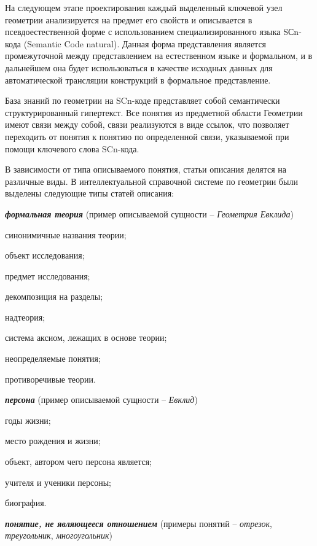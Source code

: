 На следующем этапе проектирования каждый выделенный ключевой узел геометрии анализируется на предмет его свойств и описывается в псевдоестественной форме с использованием специализированного языка SСn-кода (Semantic Code natural). Данная форма представления является промежуточной между представлением на естественном языке и формальном, и в дальнейшем она будет использоваться в качестве исходных данных для автоматической трансляции конструкций в формальное представление.

База знаний по геометрии на SCn-коде представляет собой семантически структурированный гипертекст. Все понятия из предметной области Геометрии имеют связи между собой, связи реализуются в виде ссылок, что позволяет переходить от понятия к понятию по определенной связи, указываемой при помощи ключевого слова SCn-кода.

В зависимости от типа описываемого понятия, статьи описания делятся на различные виды. В интеллектуальной справочной системе по геометрии были выделены следующие типы статей описания:

\textbf{\textit{формальная теория}} (пример описываемой сущности -- \textit{Геометрия Евклида})

\begin{textitemize}
	\item синонимичные названия теории;
	\item объект исследования;
	\item предмет исследования;
	\item декомпозиция на разделы;
	\item надтеория;
	\item система аксиом, лежащих в основе теории;
	\item неопределяемые понятия;
	\item противоречивые теории.
\end{textitemize}

\textbf{\textit{персона}} (пример описываемой сущности -- \textit{Евклид})

\begin{textitemize}
	\item годы жизни;
	\item место рождения и жизни;
	\item объект, автором чего персона является;
	\item учителя и ученики персоны;
	\item биография.
\end{textitemize}

\textbf{\textit{понятие, не являющееся отношением}} (примеры понятий -- \textit{отрезок}, \textit{треугольник}, \textit{многоугольник})

